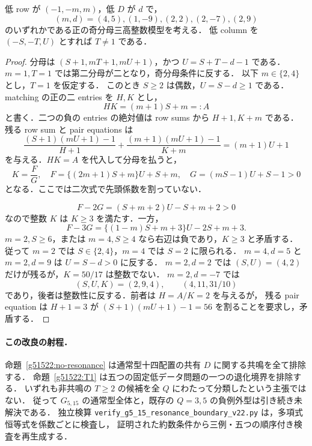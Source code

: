 \begin{proposition}\label{g51522:T1}
低 row が $(-1,-m,m)$，低 $D$ が $d$ で，
\[
 (m,d)=(4,5),(1,-9),(2,2),(2,-7),(2,9)
\]
のいずれかである正の奇分母三高整数模型を考える．
低 column を $(-S,-T,U)$ とすれば $T\ne1$ である．
\end{proposition}

\begin{proof}
分母は $(S+1,mT+1,mU+1)$，かつ $U=S+T-d-1$ である．
$m=1,T=1$ では第二分母が二となり，奇分母条件に反する．
以下 $m\in\{2,4\}$ とし，$T=1$ を仮定する．
このとき $S\ge2$ は偶数，$U=S-d\ge1$ である．
matching の正の二 entries を $H,K$ とし，
\[
 HK=(m+1)S+m=:A
\]
と書く．二つの負の entries の絶対値は row sums から $H+1,K+m$ である．
残る row sum と pair equations は
\[
 \frac{(S+1)(mU+1)-1}{H+1}
 +\frac{(m+1)(mU+1)-1}{K+m}=(m+1)U+1
\]
を与える．$HK=A$ を代入して分母を払うと，
\begin{equation}\label{g51522:T1-ratio}
 K=\frac{F}{G},\quad
 F=\{(2m+1)S+m\}U+S+m,\quad
 G=(mS-1)U+S-1>0
\end{equation}
となる．ここでは二次式で先頭係数を割っていない．

\[
 F-2G=(S+m+2)U-S+m+2>0
\]
なので整数 $K$ は $K\ge3$ を満たす．一方，
\[
 F-3G=\{(1-m)S+m+3\}U-2S+m+3.
\]
$m=2,S\ge6$，または $m=4,S\ge4$ なら右辺は負であり，$K\ge3$ と矛盾する．
従って $m=2$ では $S\in\{2,4\}$，$m=4$ では $S=2$ に限られる．
$m=4,d=5$ と $m=2,d=9$ は $U=S-d>0$ に反する．
$m=2,d=2$ では $(S,U)=(4,2)$ だけが残るが，$K=50/17$ は整数でない．
$m=2,d=-7$ では
\[
 (S,U,K)=(2,9,4),\qquad (4,11,31/10)
\]
であり，後者は整数性に反する．前者は $H=A/K=2$ を与えるが，
残る pair equation は $H+1=3$ が
$(S+1)(mU+1)-1=56$ を割ることを要求し，矛盾する．
\end{proof}

\paragraph{この改良の射程．}
命題~\ref{g51522:no-resonance} は通常型十四配置の共有 $D$ に関する共鳴を全て排除する．
命題~\ref{g51522:T1} は五つの固定低データ問題の一つの退化境界を排除する．
いずれも非共鳴の $T\ge2$ の候補を全 $Q$ にわたって分類したという主張ではない．
従って $G_{5,15}$ の通常型全体と，既存の $Q=3,5$ の負例外型は引き続き未解決である．
独立検算 \nolinkurl{verify_g5_15_resonance_boundary_v22.py} は，多項式恒等式を係数ごとに検査し，
証明された約数条件から三例・五つの順序付き検査を再生成する．
